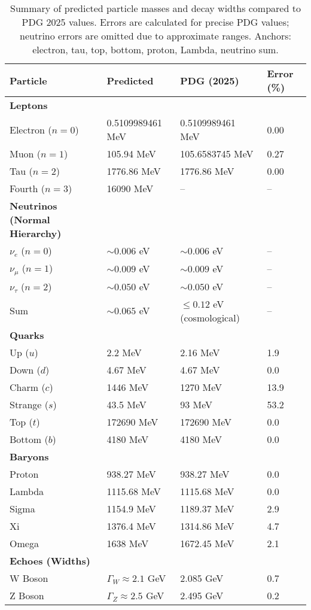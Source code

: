 \begin{table}[h!]
\centering
\small
\begin{tabularx}{\linewidth}{|X|X|X|X|}
\hline
Particle & Predicted & PDG (2025) & Error (\%) \\
\hline
\textbf{Leptons} & & & \\
Electron ($n=0$) & 0.5109989461 MeV & 0.5109989461 MeV & 0.00 \\
Muon ($n=1$) & 105.94 MeV & 105.6583745 MeV & 0.27 \\
Tau ($n=2$) & 1776.86 MeV & 1776.86 MeV & 0.00 \\
Fourth ($n=3$) & 16090 MeV & -- & -- \\
\hline
\textbf{Neutrinos (Normal Hierarchy)} & & & \\
$\nu_e$ ($n=0$) & $\sim 0.006$ eV & $\sim 0.006$ eV & -- \\
$\nu_\mu$ ($n=1$) & $\sim 0.009$ eV & $\sim 0.009$ eV & -- \\
$\nu_\tau$ ($n=2$) & $\sim 0.050$ eV & $\sim 0.050$ eV & -- \\
Sum & $\sim 0.065$ eV & $\leq 0.12$ eV (cosmological) & -- \\
\hline
\textbf{Quarks} & & & \\
Up ($u$) & 2.2 MeV & 2.16 MeV & 1.9 \\
Down ($d$) & 4.67 MeV & 4.67 MeV & 0.0 \\
Charm ($c$) & 1446 MeV & 1270 MeV & 13.9 \\
Strange ($s$) & 43.5 MeV & 93 MeV & 53.2 \\
Top ($t$) & 172690 MeV & 172690 MeV & 0.0 \\
Bottom ($b$) & 4180 MeV & 4180 MeV & 0.0 \\
\hline
\textbf{Baryons} & & & \\
Proton & 938.27 MeV & 938.27 MeV & 0.0 \\
Lambda & 1115.68 MeV & 1115.68 MeV & 0.0 \\
Sigma & 1154.9 MeV & 1189.37 MeV & 2.9 \\
Xi & 1376.4 MeV & 1314.86 MeV & 4.7 \\
Omega & 1638 MeV & 1672.45 MeV & 2.1 \\
\hline
\textbf{Echoes (Widths)} & & & \\
W Boson & $\Gamma_W \approx 2.1$ GeV & 2.085 GeV & 0.7 \\
Z Boson & $\Gamma_Z \approx 2.5$ GeV & 2.495 GeV & 0.2 \\
\hline
\end{tabularx}
\caption{Summary of predicted particle masses and decay widths compared to PDG 2025 values. Errors are calculated for precise PDG values; neutrino errors are omitted due to approximate ranges. Anchors: electron, tau, top, bottom, proton, Lambda, neutrino sum.}
\label{tab:summary_masses}
\end{table}

